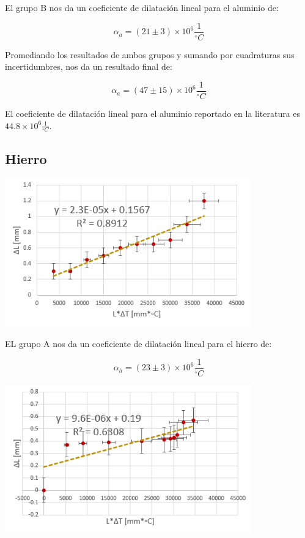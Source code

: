 \documentclass[DIV=calc, paper=a4, fontsize=11pt]{scrartcl}
\newenvironment{Figura}
  {\par\medskip\noindent\minipage{\linewidth}}
  {\endminipage\par\medskip}
\begin{document}
\begin{multicols}{2}
El grupo B nos da un coeficiente de dilatación lineal para el aluminio de:

\begin{equation*}
    \alpha_{a} = (21 \pm 3) \times 10^{6} \frac{1}{^{\circ}C}
\end{equation*}

Promediando los resultados de ambos grupos y sumando por cuadraturas sus incertidumbres, nos da un resultado final de:

\begin{equation*}
    \alpha_{a} = (47 \pm 15 ) \times 10^{6} \frac{1}{^{\circ}C}
\end{equation*}

El coeficiente de dilatación lineal para el aluminio reportado en la literatura es $44.8 \times 10^{6} \frac{1}{^{\circ}C}$.

\subsection*{Hierro}

\begin{Figura}
\centering
    \includegraphics[width=0.8\textwidth]{grafica/hierroA.PNG}
    \label{fig}
\end{Figura}

EL grupo A nos da un coeficiente de dilatación lineal para el hierro de:

\begin{equation*}
    \alpha_{h} = (23 \pm 3) \times 10^{6} \frac{1}{^{\circ}C}
\end{equation*}

\begin{Figura}
\centering
    \includegraphics[width=0.8\textwidth]{grafica/hierroB.PNG}
    \label{fig}
\end{Figura}


\end{multicols}
\end{document}
